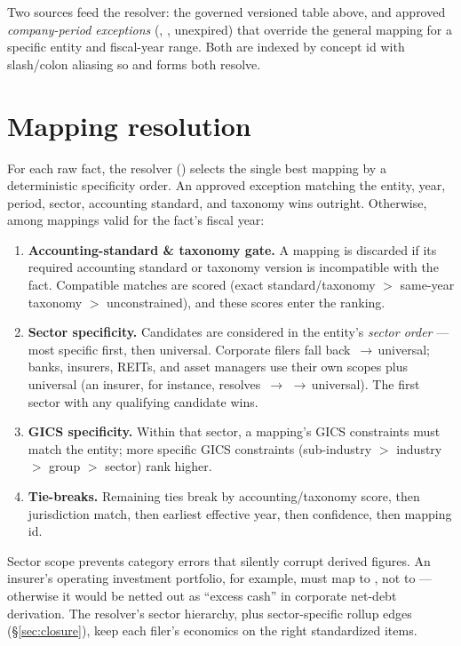 \documentclass[11pt]{article}
\begin{document}
Two sources feed the resolver: the governed versioned table above, and approved
\emph{company-period exceptions}
(, ,
unexpired) that override the general mapping for a specific entity and fiscal-year
range. Both are indexed by concept id with slash/colon aliasing so
 and  forms both resolve.

\section{Mapping resolution}
\label{sec:resolve}
For each raw fact, the resolver ()
selects the single best mapping by a deterministic specificity order. An approved
exception matching the entity, year, period, sector, accounting standard, and
taxonomy wins outright. Otherwise, among mappings valid for the fact's fiscal year:

\begin{enumerate}
  \item \textbf{Accounting-standard \& taxonomy gate.} A mapping is discarded if
        its required accounting standard or taxonomy version is incompatible with
        the fact. Compatible matches are scored (exact standard/taxonomy $>$
        same-year taxonomy $>$ unconstrained), and these scores enter the ranking.
  \item \textbf{Sector specificity.} Candidates are considered in the entity's
        \emph{sector order} --- most specific first, then universal. Corporate
        filers fall back \,$\to$\,universal; banks, insurers, REITs, and
        asset managers use their own scopes plus universal (an insurer, for
        instance, resolves \,$\to$\,\,$\to$\,universal).
        The first sector with any qualifying candidate wins.
  \item \textbf{GICS specificity.} Within that sector, a mapping's GICS constraints
        must match the entity; more specific GICS constraints (sub-industry $>$
        industry $>$ group $>$ sector) rank higher.
  \item \textbf{Tie-breaks.} Remaining ties break by accounting/taxonomy score,
        then jurisdiction match, then earliest effective year, then confidence,
        then mapping id.
\end{enumerate}

\begin{notebox}
Sector scope prevents category errors that silently corrupt derived figures. An
insurer's operating investment portfolio, for example, must map to
, not to  --- otherwise
it would be netted out as ``excess cash'' in corporate net-debt derivation. The
resolver's sector hierarchy, plus sector-specific rollup edges (\S\ref{sec:closure}),
keep each filer's economics on the right standardized items.
\end{notebox}
\end{document}

